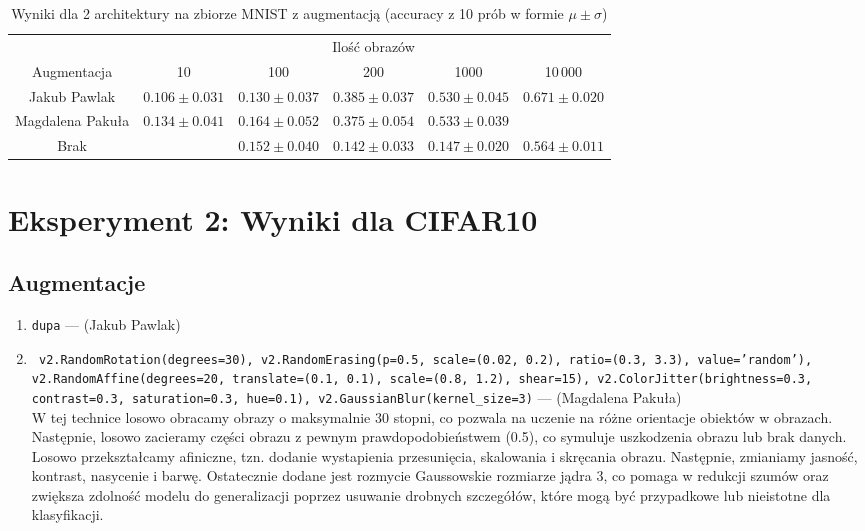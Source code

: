 \documentclass[10pt]{article}
\begin{document}
\begin{table}[H]\centering
    \begin{tabular}{cccccc}
        \toprule
                         & \multicolumn{5}{c}{Ilość obrazów}                                                                                   \\ \cmidrule{2-6}
        Augmentacja      & 10                                & 100                & 200                & 1000              & 10\,000           \\ \midrule
        Jakub Pawlak     & $0.106 \pm 0.031 $                & $0.130 \pm 0.037 $ & $0.385 \pm 0.037 $ & $0.530 \pm 0.045$ & $0.671 \pm 0.020$ \\
        Magdalena Pakuła & $0.134 \pm 0.041 $                & $0.164 \pm 0.052$  & $0.375 \pm 0.054 $ & $0.533 \pm 0.039$                     \\
        Brak             &                                   & $0.152 \pm 0.040$  & $0.142 \pm 0.033$  & $0.147 \pm 0.020$ & $0.564 \pm 0.011$ \\
        \bottomrule
    \end{tabular}
    \caption{Wyniki dla 2 architektury na zbiorze MNIST z augmentacją (accuracy z 10 prób w formie $\mu \pm \sigma$)}
\end{table}

\pagebreak
\section{Eksperyment 2: Wyniki dla CIFAR10}\label{sec:ex2_cifar}

\subsection*{Augmentacje}
\begin{enumerate}
    \item \texttt{dupa} --- (Jakub Pawlak)
    \item \texttt{  v2.RandomRotation(degrees=30),
                    v2.RandomErasing(p=0.5, scale=(0.02, 0.2), ratio=(0.3, 3.3), value='random'),
                    v2.RandomAffine(degrees=20, translate=(0.1, 0.1), scale=(0.8, 1.2), shear=15),
                    v2.ColorJitter(brightness=0.3, contrast=0.3, saturation=0.3, hue=0.1),
                    v2.GaussianBlur(kernel_size=3)} --- (Magdalena Pakuła)  \\
                    W tej technice losowo obracamy obrazy o maksymalnie 30 stopni, co pozwala na uczenie na różne orientacje obiektów w obrazach.
                    Następnie, losowo zacieramy części obrazu z pewnym prawdopodobieństwem (0.5), co symuluje uszkodzenia obrazu lub brak danych.
                    Losowo przekształcamy afiniczne, tzn. dodanie wystapienia przesunięcia, skalowania i skręcania obrazu. Następnie, zmianiamy jasność, kontrast, nasycenie i barwę.
                    Ostatecznie dodane jest rozmycie Gaussowskie rozmiarze jądra 3, co pomaga w redukcji szumów oraz zwiększa zdolność modelu do generalizacji poprzez usuwanie drobnych szczegółów, które mogą być przypadkowe lub nieistotne dla klasyfikacji.

\end{enumerate}
\end{document}
